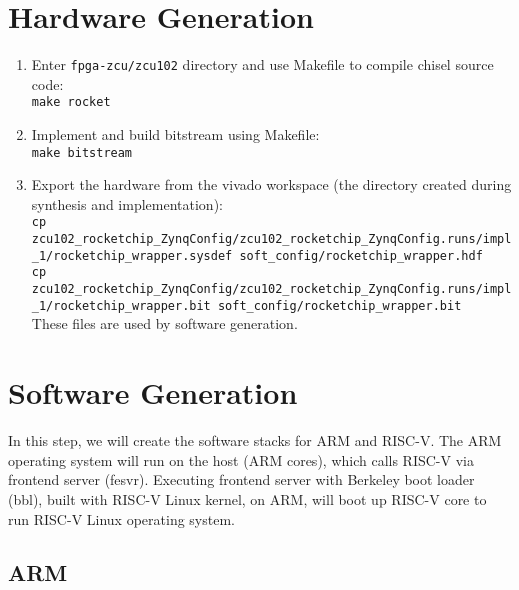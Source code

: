 \documentclass[a4paper,11pt]{article}
\begin{document}
\section{Hardware Generation}
\begin{enumerate}
\item Enter  {\tt fpga-zcu/zcu102} directory and use Makefile to compile chisel source code:\\
{\tt make rocket}
\item Implement and build bitstream using Makefile:\\
 {\tt make bitstream}
 

\item Export the hardware from the vivado workspace (the directory created during synthesis and implementation):\\
{\tt cp zcu102\_rocketchip\_ZynqConfig/zcu102\_rocketchip\_ZynqConfig.runs/impl\_1/rocketchip\_wrapper.sysdef soft\_config/rocketchip\_wrapper.hdf}\\
{\tt cp zcu102\_rocketchip\_ZynqConfig/zcu102\_rocketchip\_ZynqConfig.runs/impl\_1/rocketchip\_wrapper.bit soft\_config/rocketchip\_wrapper.bit}\\

These files are used by software generation.
\end{enumerate}

\section{Software Generation}
In this step, we will create the software stacks for ARM and RISC-V. The ARM operating system will run on the host (ARM cores), which calls RISC-V via frontend server (fesvr). Executing frontend server with Berkeley boot loader (bbl), built with RISC-V Linux kernel, on ARM, will boot up RISC-V core to run RISC-V Linux operating system.  

\subsection{ARM}\label{sec-arm}
\end{document}
